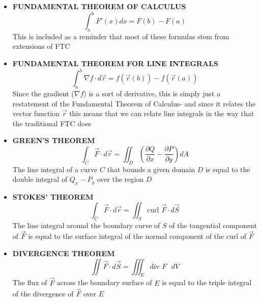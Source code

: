 \documentclass{package/notes}
\begin{document}
\begin{itemize}
	\item \textbf{FUNDAMENTAL THEOREM OF CALCULUS}
	$$\int_{a}^{b} F'(x)dx = F(b) -F(a)$$
	This is included as a reminder that most of these formulas stem from extensions of FTC

	\item \textbf{FUNDAMENTAL THEOREM FOR LINE INTEGRALS}
	$$\int_{a}^{b} \nabla f \cdot d\vec{r} = f(\vec{r}(b)) - f(\vec{r}(a))$$
	Since the gradient ($\nabla f$) is a sort of derivative, this is simply just a restatement of the Fundamental Theorem of Calculus- and since it relates the vector function $\vec{r}$ this means that we can relate line integrals in the way that the traditional FTC does

	\item \textbf{GREEN'S THEOREM}
	$$
	\int_C \vec{F} \cdot d\vec{r} =\iint_D \left(\frac{\partial{Q}}{\partial{x}}-\frac{\partial{P}}{\partial{y}}\right)dA
	$$
	The line integral of a curve $C$ that bounds a given domain $D$ is equal to the double integral of $Q_x - P_y$ over the region $D$  

	\item \textbf{STOKES' THEOREM}
	$$\int_C \vec{F} \cdot d\vec{r} =\iint_S \text{curl } \vec{F} \cdot d\vec{S}$$
	The line integral around the boundary curve of $S$ of the tangential component of $\vec{F}$ is equal to the surface integral of the normal component of the curl of $\vec{F}$ 

	\item \textbf{DIVERGENCE THEOREM}
	$$\iint \vec{F} \cdot d\vec{S} = \iiint_E \text{div }F\text{ }dV$$
	The flux of $\vec{F}$ across the boundary surface of $E$ is equal to the triple integral of the divergence of $\vec{F}$ over $E$  
\end{itemize}
\end{document}
